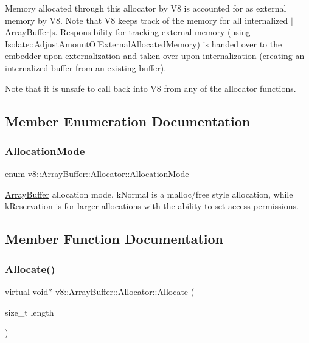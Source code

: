 Memory allocated through this allocator by V8 is accounted for as external memory by V8. Note that V8 keeps track of the memory for all internalized $\vert$\+Array\+Buffer$\vert$s. Responsibility for tracking external memory (using Isolate\+::\+Adjust\+Amount\+Of\+External\+Allocated\+Memory) is handed over to the embedder upon externalization and taken over upon internalization (creating an internalized buffer from an existing buffer).

Note that it is unsafe to call back into V8 from any of the allocator functions. 

\subsection{Member Enumeration Documentation}
\mbox{\label{classv8_1_1ArrayBuffer_1_1Allocator_ab106d1fbad7be9f6fd8b0f5c550ac59e}} 
\subsubsection{\texorpdfstring{Allocation\+Mode}{AllocationMode}}
{\footnotesize\ttfamily enum \mbox{\hyperlink{classv8_1_1ArrayBuffer_1_1Allocator_ab106d1fbad7be9f6fd8b0f5c550ac59e}{v8\+::\+Array\+Buffer\+::\+Allocator\+::\+Allocation\+Mode}}\hspace{0.3cm}{\ttfamily [strong]}}

\mbox{\hyperlink{classv8_1_1ArrayBuffer}{Array\+Buffer}} allocation mode. k\+Normal is a malloc/free style allocation, while k\+Reservation is for larger allocations with the ability to set access permissions. 

\subsection{Member Function Documentation}
\mbox{\label{classv8_1_1ArrayBuffer_1_1Allocator_a106b0d80120ed04fe9b9675e96f0340b}} 
\subsubsection{\texorpdfstring{Allocate()}{Allocate()}}
{\footnotesize\ttfamily virtual void$\ast$ v8\+::\+Array\+Buffer\+::\+Allocator\+::\+Allocate (\begin{DoxyParamCaption}\item[{size\+\_\+t}]{length }\end{DoxyParamCaption})\hspace{0.3cm}{\ttfamily [pure virtual]}}

